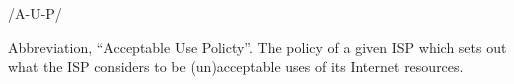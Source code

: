  /A-U-P/

Abbreviation, ``Acceptable Use Policty''. The policy of a given ISP which sets out what the ISP considers to be (un)acceptable uses of its
Internet resources.

